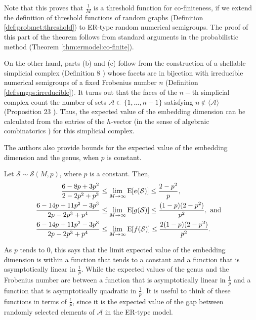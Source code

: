 Note that this proves that $\frac{1}{M}$ is a threshold function for co-finiteness, if we extend the definition of threshold functions of random graphs (Definition \ref{def:probmet:threshold}) to ER-type random numerical semigroups. The proof of this part of the theorem follows from standard arguments in the probabilistic method (Theorem \ref{thm:ermodel:co-finite}). \par
On the other hand, parts (b) and (c) follow from the construction of a shellable simplicial complex (Definition 8 \cite{de2018random}) whose facets are in bijection with irreducible numerical semigroups of a fixed Frobenius number $n$ (Definition \ref{def:smgps:irreducible}). It turns out that the faces of the $n-$th simplicial complex count the number of sets $\mathcal{A} \subset \{1, \ldots, n - 1\}$ satisfying $n \notin \langle\mathcal{A} \rangle$ (Proposition 23 \cite{de2018random}). Thus, the expected value of the embedding dimension can be calculated from the entries of the $h$-vector (in the sense of algebraic combinatorics \cite{stanley2007combinatorics}) for this simplicial complex. \par

The authors also provide bounds for the expected value of the embedding dimension and the genus, when $p$ is constant.

\begin{theorem}\label{thm:ermodel:constantp}
    Let $\mathcal{S} \sim \mathcal{S}(M, p)$, where $p$ is a constant. Then, 
    \begin{align*}
        \frac{6 - 8p + 3p^2}{2 - 2p^2 + p^3} &\leq \lim_{M \to \infty} \mathrm{E}[e(\mathcal{S})] \leq \frac{2 - p^2}{p}, \\
        \frac{6 - 14p + 11p^2 - 3p^3}{2p - 2p^3 + p^4} &\leq \lim_{M \to \infty} \mathrm{E}[g(\mathcal{S})] \leq \frac{(1 - p)(2 - p^2)}{p^2}, \text{ and}\\
        \frac{6 - 14p + 11p^2 - 3p^3}{2p - 2p^3 + p^4} &\leq \lim_{M \to \infty} \mathrm{E}[f(\mathcal{S})] \leq \frac{2(1 - p)(2 - p^2)}{p^2}.
    \end{align*}
\end{theorem}
As $p$ tends to 0, this says that the limit expected value of the embedding dimension is within a function that tends to a constant and a function that is asymptotically linear in $\frac{1}{p}$. While the expected values of the genus and the Frobenius number are between a function that is asymptotically linear in $\frac{1}{p}$ and a function that is asymptotically quadratic in $\frac{1}{p}$. It is useful to think of these functions in terms of $\frac{1}{p}$, since it is the expected value of the gap between randomly selected elements of $\mathcal{A}$ in the ER-type model. \par 

